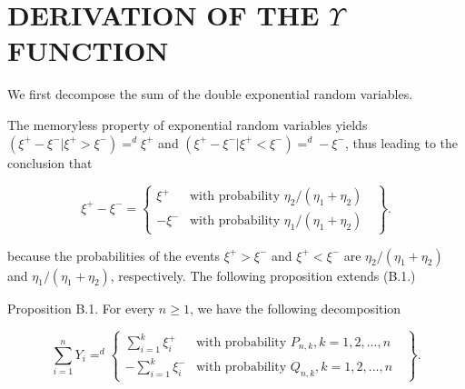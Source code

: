 \chapter{DERIVATION OF THE $\Upsilon$ FUNCTION}%
\label{appendixB}






We first decompose the sum of the double exponential random variables.

The memoryless property of exponential random variables yields $(\xi^{+}-\xi^{-}|\xi^{+}>\xi^{-})=^{d}\xi^{+}$ and $(\xi^{+}-\xi^{-}|\xi^{+}<\xi^{-})=^{d}-\xi^{-}$, thus leading to the conclusion that

\begin{equation*}
\xi^{+}-\xi^{-} =\left\{
\begin{array}{rl}
\xi^{+} & \text{with probability $\eta_{2}/(\eta_{1}+\eta_{2})$ }\\
-\xi^{-} & \text{with probability $\eta_{1}/(\eta_{1}+\eta_{2})$ }
\end{array}\right\}.
\end{equation*}

because the probabilities of the events $\xi^{+}>\xi^{-}$ and $\xi^{+}<\xi^{-}$ are $\eta_{2}/(\eta_{1}+\eta_{2})$ and $\eta_{1}/(\eta_{1}+\eta_{2})$, respectively. The following proposition extends (B.1.)

Proposition B.1. For every $n\geq1$, we have the following decomposition

\begin{equation*}
\sum_{i=1}^{n}Y_{i}=^{d}\left\{
\begin{array}{rl}
\sum_{i=1}^{k}\xi_{i}^{+} & \text{with probability $P_{n,k},k=1,2,...,n$ }\\
-\sum_{i=1}^{k}\xi_{i}^{-} & \text{with probability $Q_{n,k},k=1,2,...,n$ }
\end{array}\right\}.
\end{equation*}

